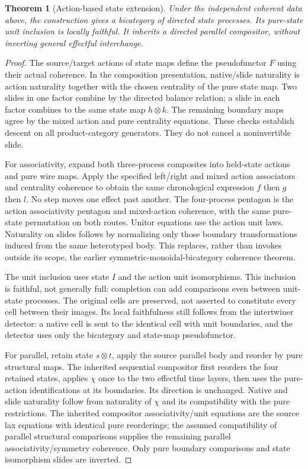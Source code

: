 \documentclass[11pt]{article}
\newtheorem{theorem}{Theorem}
\begin{document}
\begin{theorem}[Action-based state extension]
Under the independent coherent data above, the construction gives a bicategory of directed state processes. Its pure-state unit inclusion is locally faithful. It inherits a directed parallel compositor, without inverting general effectful interchange.
\end{theorem}
\begin{proof}
The source/target actions of state maps define the pseudofunctor $F$ using their actual coherence. In the composition presentation, native/slide naturality is action naturality together with the chosen centrality of the pure state map. Two slides in one factor combine by the directed balance relation; a slide in each factor combines to the same state map $h\otimes k$. The remaining boundary maps agree by the mixed action and pure centrality equations. These checks establish descent on all product-category generators. They do not cancel a noninvertible slide.

For associativity, expand both three-process composites into held-state actions and pure wire maps. Apply the specified left/right and mixed action associators and centrality coherence to obtain the same chronological expression $f$ then $g$ then $l$. No step moves one effect past another. The four-process pentagon is the action associativity pentagon and mixed-action coherence, with the same pure-state permutation on both routes. Unitor equations use the action unit laws. Naturality on slides follows by normalizing only those boundary transformations induced from the same heterotyped body. This replaces, rather than invokes outside its scope, the earlier symmetric-monoidal-bicategory coherence theorem.

The unit inclusion uses state $I$ and the action unit isomorphisms. This inclusion is faithful, not generally full: completion can add comparisons even between unit-state processes. The original cells are preserved, not asserted to constitute every cell between their images. Its local faithfulness still follows from the intertwiner detector: a native cell is sent to the identical cell with unit boundaries, and the detector uses only the bicategory and state-map pseudofunctor.

For parallel, retain state $s\otimes t$, apply the source parallel body and reorder by pure structural maps. The inherited sequential compositor first reorders the four retained states, applies $\chi$ once to the two effectful time layers, then uses the pure-action identifications at its boundaries. Its direction is unchanged. Native and slide naturality follow from naturality of $\chi$ and its compatibility with the pure restrictions. The inherited compositor associativity/unit equations are the source lax equations with identical pure reorderings; the assumed compatibility of parallel structural comparisons supplies the remaining parallel associativity/symmetry coherence. Only pure boundary comparisons and state isomorphism slides are inverted.
\end{proof}
\end{document}
